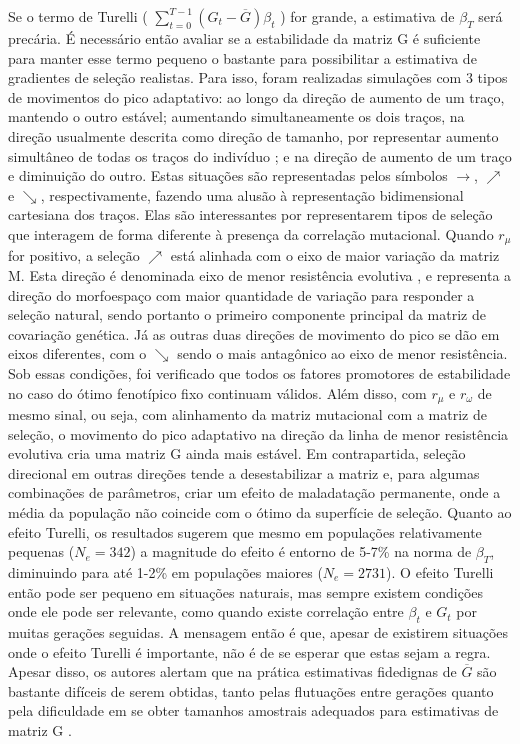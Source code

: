 Se o termo de Turelli (  $\sum_{t=0}^{T-1} (G_t - \overline {G})
\beta_t$ ) for grande, a estimativa de $\beta_T$ será precária. 
É necessário então avaliar se a estabilidade da matriz G é suficiente
para manter esse termo pequeno o bastante para possibilitar a
estimativa de gradientes de seleção realistas. 
Para isso, foram realizadas simulações com 3 tipos de movimentos do pico
adaptativo: ao longo da direção de aumento de um traço, mantendo o outro
estável; aumentando simultaneamente os dois traços, na direção usualmente
descrita como direção de tamanho, por representar aumento simultâneo de
todas os traços do indivíduo \citep{Marroig2005}; e na direção de
aumento de um traço e diminuição do outro. 
Estas situações são representadas pelos símbolos $\rightarrow$,
$\nearrow$ e $\searrow$, respectivamente, fazendo uma alusão à
representação bidimensional cartesiana dos traços. 
Elas são interessantes por representarem tipos de seleção que interagem
de forma diferente à presença da correlação mutacional. 
Quando $r_\mu$ for positivo, a seleção $\nearrow$ está alinhada com o
eixo de maior variação da matriz M. 
Esta direção é denominada eixo de menor resistência evolutiva
\citep{Schluter1996}, e  representa a direção do morfoespaço com maior
quantidade de variação para responder a seleção natural, sendo portanto
o primeiro componente principal da matriz de covariação genética. 
Já as outras duas direções de movimento do pico se dão em eixos
diferentes, com o $\searrow$ sendo o mais antagônico ao eixo de menor
resistência. 
Sob essas condições, foi verificado que todos os fatores promotores de
estabilidade no caso do ótimo fenotípico fixo continuam válidos. 
Além disso, com $r_\mu$ e $r_\omega$ de mesmo sinal, ou seja, com
alinhamento da matriz mutacional com a matriz de seleção, o movimento
do pico adaptativo na direção da linha de menor resistência evolutiva
cria uma matriz G ainda mais estável. 
Em contrapartida, seleção direcional em outras direções tende a
desestabilizar a matriz e, para algumas combinações de parâmetros, criar
um efeito de maladatação permanente, onde a média da população não
coincide com o ótimo da superfície de seleção. 
Quanto ao efeito Turelli, os resultados sugerem que mesmo em populações
relativamente pequenas ($N_e=342$) a magnitude do efeito é entorno de
5-7\% na norma de $\beta_T$, diminuindo para até 1-2\% em populações
maiores ($N_e=2731$). 
O efeito Turelli então pode ser pequeno em situações naturais, mas
sempre existem condições onde ele pode ser relevante, como quando existe
correlação entre $\beta_t$ e $G_t$ por muitas gerações seguidas. 
A mensagem então é que, apesar de existirem situações onde o efeito
Turelli é importante, não é de se esperar que estas sejam a regra. 
Apesar disso, os autores alertam que na prática estimativas fidedignas
de $\overline {G}$ são bastante difíceis de serem obtidas, tanto pelas
flutuações entre gerações quanto pela dificuldade em se obter tamanhos
amostrais adequados para estimativas de matriz G \citep{Marroig2011b}.

